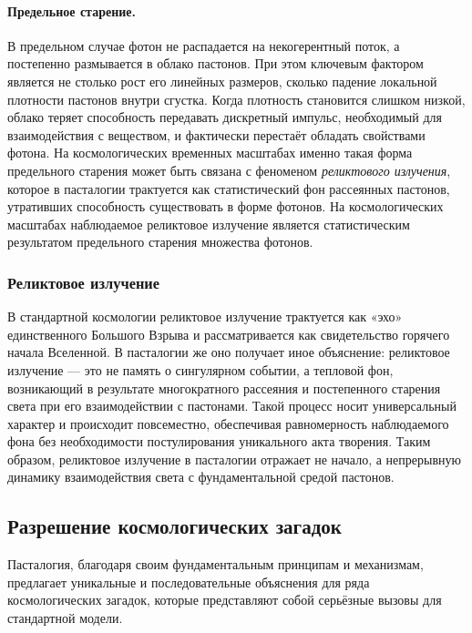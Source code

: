 \documentclass[pdflatex,sn-mathphys-num,referee]{sn-jnl}
\begin{document}
\paragraph{Предельное старение.}
В предельном случае фотон не распадается на некогерентный поток, а постепенно размывается в облако пастонов. При этом ключевым фактором является не столько рост его линейных размеров, сколько падение локальной плотности пастонов внутри сгустка. Когда плотность становится слишком низкой, облако теряет способность передавать дискретный импульс, необходимый для взаимодействия с веществом, и фактически перестаёт обладать свойствами фотона. На космологических временных масштабах именно такая форма предельного старения может быть связана с феноменом \emph{реликтового излучения}, которое в пасталогии трактуется как статистический фон рассеянных пастонов, утративших способность существовать в форме фотонов. На космологических масштабах наблюдаемое реликтовое излучение является статистическим результатом предельного старения множества фотонов.

\subsubsection*{Реликтовое излучение}\label{subsubsec:relic-radiation}
В стандартной космологии реликтовое излучение трактуется как «эхо» единственного Большого Взрыва \cite{alpher1948-bigbang, penzias1965-cmb} и рассматривается как свидетельство горячего начала Вселенной.
В пасталогии же оно получает иное объяснение: реликтовое излучение — это не память о сингулярном событии, а тепловой фон, возникающий в результате многократного рассеяния и постепенного старения света при его взаимодействии с пастонами.
Такой процесс носит универсальный характер и происходит повсеместно, обеспечивая равномерность наблюдаемого фона без необходимости постулирования уникального акта творения.
Таким образом, реликтовое излучение в пасталогии отражает не начало, а непрерывную динамику взаимодействия света с фундаментальной средой пастонов.

\subsection{Разрешение космологических загадок}\label{subsec:cosmological-solutions}

Пасталогия, благодаря своим фундаментальным принципам и механизмам, предлагает уникальные и последовательные объяснения для ряда космологических загадок, которые представляют собой серьёзные вызовы для стандартной модели.
\end{document}
